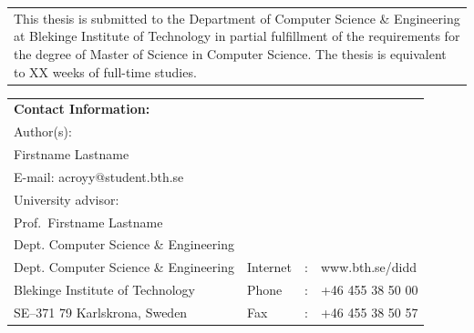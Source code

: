 
{\pagestyle{empty}
\changepage{5cm}{1cm}{-0.5cm}{-0.5cm}{}{-2cm}{}{}{}
\noindent%
\begin{tabular}{p{\textwidth}}
{\small This thesis is submitted to the Department of Computer Science \& Engineering at Blekinge
Institute of Technology in partial fulfillment of the requirements for the degree of Master
of Science in Computer Science. The thesis is equivalent to XX weeks of
full-time studies.}
\end{tabular}

\par\vspace {12cm}

\noindent%
\begin{tabular}{p{}lcl}
\textbf{Contact Information:}\\
Author(s):\\
Firstname Lastname\\
E-mail: acroyy@student.bth.se\\
\par\vspace {5cm}
University advisor:\\
Prof.\ Firstname Lastname\\
Dept. Computer Science \& Engineering

\par\vspace {1cm}

\noindent%
 \\
Dept. Computer Science \& Engineering & Internet & : & www.bth.se/didd\\
Blekinge Institute of Technology & Phone	& : & +46 455 38 50 00 \\
SE--371 79 Karlskrona, Sweden & Fax & : & +46 455 38 50 57 \\
\end{tabular}
\clearpage
} %

\setcounter{page}{1}